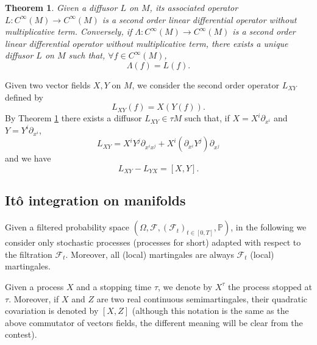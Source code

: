 \documentclass{article}[10pt]
\newtheorem{theorem}{Theorem}[section]
\newcommand{\cinf}[0]{C^{\infty}}
\begin{document}
\begin{theorem}\label{theorem_codiffusor2}
Given a diffusor $L$ on $M$, its  associated operator $L: \cinf (M) \rightarrow \cinf(M) $ is a second order linear differential
operator without multiplicative term. Conversely, if $\Lambda: \cinf (M) \rightarrow \cinf(M) $ is a second order linear differential operator  without multiplicative term,
there exists a unique diffusor $L$ on $M$ such that, $\forall f \in \cinf(M)$,
$$\Lambda(f)=L(f).$$
\end{theorem}

Given  two vector fields $ X, Y $   on $ M $, we consider the second order operator $ L_{XY} $ defined by
\begin{equation}
L_{XY}(f)=X(Y(f)).
\end{equation}
By Theorem \ref{theorem_codiffusor2} there exists a diffusor $L_{XY} \in \tau M$ such that, if $ X = X ^ i \partial_ {x ^ i} $ and $ Y = Y ^ i \partial_ {x ^ i} $,
\begin{equation}
L_{XY}=X^iY^j\partial_{x^ix^j}+X^i(\partial_{x^i}Y^j)\partial_{x^j}
\end{equation}
and we have
$$L_{XY}-L_{YX}=[X,Y].$$

\subsection{It\^o integration on manifolds}

Given a filtered probability space $(\Omega, \mathcal F, (\mathcal {F} _t) _ {t \in [0, T]}, \mathbb {P})$, in the following we consider only stochastic
processes (processes for short) adapted with respect
to the filtration $ \mathcal {F} _t $. Moreover, all (local) martingales are always $ \mathcal {F} _t $ (local) martingales.

Given a process $ X $ and a stopping time  $ \tau $,
we denote by $ X ^{\tau} $ the process stopped at $ \tau $. Moreover,  if $X$ and $Z$ are two real continuous semimartingales, their quadratic  covariation is denoted by $[X,Z]$ (although this notation is the same as the above commutator of  vectors fields, the different meaning will be clear from the contest).
\end{document}
